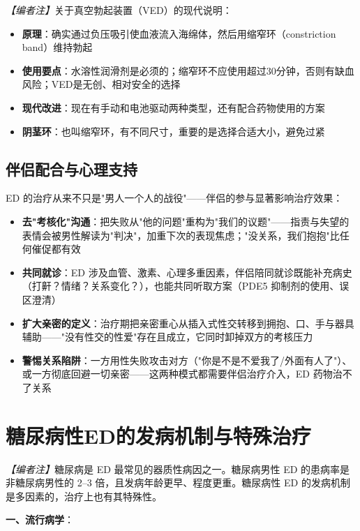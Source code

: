 \noindent\textit{【编者注】}关于真空勃起装置（VED）的现代说明：
\begin{itemize}
	\item \textbf{原理}：确实通过负压吸引使血液流入海绵体，然后用缩窄环（constriction band）维持勃起
	\item \textbf{使用要点}：水溶性润滑剂是必须的；缩窄环不应使用超过30分钟，否则有缺血风险；VED是无创、相对安全的选择
	\item \textbf{现代改进}：现在有手动和电池驱动两种类型，还有配合药物使用的方案
	\item \textbf{阴茎环}：也叫缩窄环，有不同尺寸，重要的是选择合适大小，避免过紧
\end{itemize}
\subsection{伴侣配合与心理支持}


ED 的治疗从来不只是"男人一个人的战役"——伴侣的参与显著影响治疗效果：

\begin{itemize}
	\item \textbf{去"考核化"沟通}：把失败从"他的问题"重构为"我们的议题"——指责与失望的表情会被男性解读为"判决"，加重下次的表现焦虑；"没关系，我们抱抱"比任何催促都有效
	\item \textbf{共同就诊}：ED 涉及血管、激素、心理多重因素，伴侣陪同就诊既能补充病史（打鼾？情绪？关系变化？），也能共同听取方案（PDE5 抑制剂的使用、误区澄清）
	\item \textbf{扩大亲密的定义}：治疗期把亲密重心从插入式性交转移到拥抱、口、手与器具辅助——"没有性交的性爱"存在且成立，它同时卸掉双方的考核压力
	\item \textbf{警惕关系陷阱}：一方用性失败攻击对方（"你是不是不爱我了/外面有人了"）、或一方彻底回避一切亲密——这两种模式都需要伴侣治疗介入，ED 药物治不了关系
\end{itemize}


\section{糖尿病性ED的发病机制与特殊治疗}
\label{sec:diabetic_ed}

\noindent\textit{【编者注】}糖尿病是 ED 最常见的器质性病因之一。糖尿病男性 ED 的患病率是非糖尿病男性的 2--3 倍，且发病年龄更早、程度更重。糖尿病性 ED 的发病机制是多因素的，治疗上也有其特殊性。

\vspace{0.5em}
\noindent\textbf{一、流行病学}：

